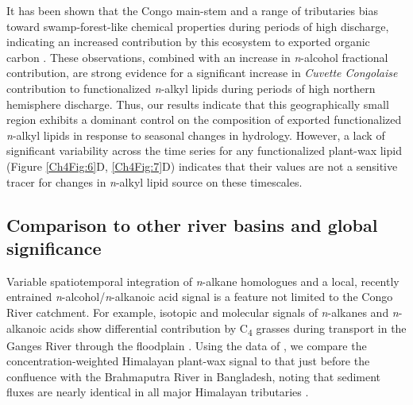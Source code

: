 It has been shown that the Congo main-stem and a range of tributaries bias toward swamp-forest-like chemical properties during periods of high discharge, indicating an increased contribution by this ecosystem to exported organic carbon \citep{Wang:2013js,Mann:2014jx}. These observations, combined with an increase in \textit{n}-alcohol fractional contribution, are strong evidence for a significant increase in \textit{Cuvette Congolaise} contribution to functionalized \textit{n}-alkyl lipids during periods of high northern hemisphere discharge. Thus, our results indicate that this geographically small region \citep[4\% coverage;][]{Mayaux:2004uw} exhibits a dominant control on the composition of exported functionalized \textit{n}-alkyl lipids in response to seasonal changes in hydrology. However, a lack of significant  variability across the time series for any functionalized plant-wax lipid (Figure \ref{Ch4Fig:6}D, \ref{Ch4Fig:7}D) indicates that their  values are not a sensitive tracer for changes in \textit{n}-alkyl lipid source on these timescales.

\subsection{Comparison to other river basins and global significance}

Variable spatiotemporal integration of \textit{n}-alkane homologues and a local, recently entrained \textit{n}-alcohol/\textit{n}-alkanoic acid signal is a feature not limited to the Congo River catchment. For example, isotopic and molecular signals of \textit{n}-alkanes and \textit{n}-alkanoic acids show differential contribution by C\textsubscript{4} grasses during transport in the Ganges River through the floodplain \citep{Galy:2011ix}. Using the data of \citet{Galy:2011ix}, we compare the concentration-weighted Himalayan plant-wax signal to that just before the confluence with the Brahmaputra River in Bangladesh, noting that sediment fluxes are nearly identical in all major Himalayan tributaries \citep{Andermann:2012br}.

